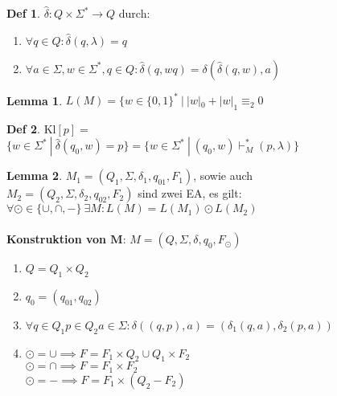 \documentclass[a4paper, 10pt]{article}
\theoremstyle{definition}
\newtheorem{lemma}{Lemma}[section]
\newtheorem*{definition*}{Def}
\newcommand{\words}{\Sigma^*}
\newcommand{\A}{\Sigma}
\begin{document}
\pagebreak
\begin{definition*}
    \(\hat{\delta}: Q \times \words \to Q\) durch:
    \begin{enumerate}[label=(\roman*)]
        \item \(\forall q \in Q: \hat{\delta}(q, \lambda) = q\)
        \item \(\forall a \in \A, w \in \words, q \in Q: \hat{\delta}(q, wq) = \delta(\hat{\delta}(q, w), a)\)
    \end{enumerate}
\end{definition*}

\begin{lemma}
    \(L(M) = \{w \in \{0, 1\}^* \ | \ |w|_0 + |w|_1 \equiv_2 0\)
\end{lemma}

\begin{definition*} \(\text{Kl}[p] =\) \\
    \(\{w \in \words \ | \ \hat{\delta}(q_0, w) = p\} = \{w \in \words \ | \ (q_0, w) \vdash_M^* (p, \lambda)\}\)
\end{definition*}

\begin{lemma}
    \(M_1 = (Q_1, \A, \delta_1, q_{01}, F_1)\), sowie auch \\ \(M_2 = (Q_2, \A, \delta_2, q_{02}, F_2)\) sind zwei EA, es gilt: \\ 
    \(\forall \odot \in \{\cup, \cap, -\} \ \exists M: L(M) = L(M_1) \odot L(M_2)\) \\ \ \\
    \textbf{Konstruktion von \(\bm{M}\)}: \(M = (Q , \A, \delta, q_0, F_{\odot})\)
    \begin{enumerate}[label=(\roman*)]
        \item \(Q = Q_1 \times Q_2\)
        \item \(q_0 = (q_{01}, q_{02})\)
        \item \(\forall q \in Q_1 p \in Q_2 a \in \A: \delta((q, p), a) = (\delta_1(q, a), \delta_2(p, a))\)
        \item \(\odot = \cup \implies F = F_1 \times Q_2 \cup Q_1 \times F_2\) \\
        \(\odot = \cap \implies F = F_1 \times F_2\) \\
        \(\odot = - \implies F = F_1 \times (Q_2 - F_2)\)
    \end{enumerate}
\end{lemma}
\end{document}
